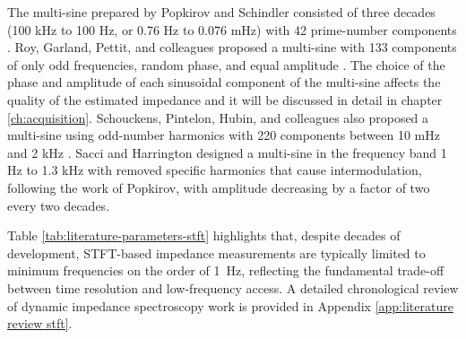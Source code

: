 The multi-sine prepared by Popkirov and Schindler consisted of three decades (100 kHz to 100 Hz, or 0.76 Hz to 0.076 mHz) with 42 prime-number components \cite{popkirovOptimizationPerturbationSignal1993a}.
Roy, Garland, Pettit, and colleagues proposed a multi-sine with 133 components of only odd frequencies, random phase, and equal amplitude \cite{waltersWeakAdsorptionAnions2001a}.
The choice of the phase and amplitude of each sinusoidal component of the multi-sine affects the quality of the estimated impedance and it will be discussed in detail in chapter \ref{ch:acquisition}.
Schouckens, Pintelon, Hubin, and colleagues also proposed a multi-sine using odd-number harmonics with 220 components between 10 mHz and 2 kHz \cite{vaningelgemAdvantagesOddRandom2009}.
Sacci and Harrington designed a multi-sine in the frequency band 1 Hz to 1.3 kHz with removed specific harmonics that cause intermodulation, following the work of Popkirov, with amplitude decreasing by a factor of two every two decades.

Table \ref{tab:literature-parameters-stft} highlights that, despite decades of development, STFT-based impedance measurements are typically limited to minimum frequencies on the order of 1~Hz, reflecting the fundamental trade-off between time resolution and low-frequency access.
A detailed chronological review of dynamic impedance spectroscopy work is provided in Appendix \ref{app:literature review stft}.


